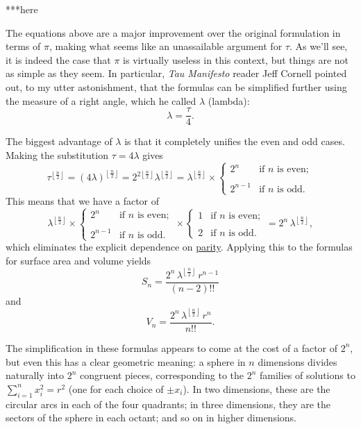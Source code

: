 ***here

The equations above are a major improvement over the original formulation in terms of $\pi$, making what seems like an unassailable argument for $\tau$. As we'll see, it is indeed the case that $\pi$ is virtually useless in this context, but things are not as simple as they seem. In particular, \emph{Tau Manifesto} reader Jeff Cornell pointed out, to my utter astonishment, that the formulas can be simplified further using the measure of a right angle, which he called $\lambda$ (lambda):
\[
\lambda = \frac{\tau}{4}.
\]

The biggest advantage of $\lambda$ is that it completely unifies the even and odd cases. Making the substitution $\tau = 4\lambda$ gives
\[
\tau^{\left\lfloor \frac{n}{2} \right\rfloor} = (4\lambda)^{\left\lfloor \frac{n}{2} \right\rfloor} = 2^{2\left\lfloor \frac{n}{2} \right\rfloor} \lambda^{\left\lfloor \frac{n}{2} \right\rfloor} =
\lambda^{\left\lfloor \frac{n}{2} \right\rfloor}\times
\begin{cases}
 2^n & \text{if } n \text{ is even}; \\ \\
 2^{n-1} & \text{if } n \text{ is odd}.
 \end{cases}
\]
This means that we have a factor of
\[
 \lambda^{\left\lfloor \frac{n}{2} \right\rfloor} \times
\begin{cases}
 2^n & \text{if } n \text{ is even}; \\ \\
 2^{n-1} & \text{if } n \text{ is odd}.
 \end{cases}
  \times \begin{cases}
 1 & \text{if } n \text{ is even}; \\ \\
 2 & \text{if } n \text{ is odd}.
 \end{cases}
 = 2^n\,\lambda^{\left\lfloor \frac{n}{2} \right\rfloor},
\]
which eliminates the explicit dependence on \href{http://en.wikipedia.org/wiki/Parity_(mathematics)}{parity}. Applying this to the formulas for surface area and volume yields
\[ S_n = \frac{2^n\,\lambda^{\left\lfloor \frac{n}{2} \right\rfloor}\,r^{n-1}}{(n-2)!!}
\]
and
\[ V_n = \frac{2^n\,\lambda^{\left\lfloor \frac{n}{2} \right\rfloor}\,r^n}{n!!}.
\]

The simplification in these formulas appears to come at the cost of a factor of $2^n$, but even this has a clear geometric meaning: a sphere in $n$ dimensions divides naturally into $2^n$ congruent pieces, corresponding to the $2^n$ families of solutions to $\sum_{i=1}^{n} x_i^2 = r^2$ (one for each choice of $\pm x_i$). In two dimensions, these are the circular arcs in each of the four quadrants; in three dimensions, they are the sectors of the sphere in each octant; and so on in higher dimensions.

